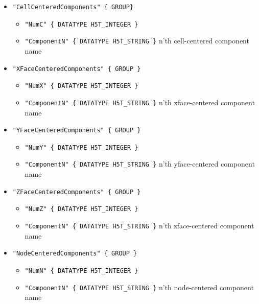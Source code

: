 \begin{itemize}
    \item {\tt "CellCenteredComponents" \{ GROUP\}}
        \begin{itemize} 
            \item  {\tt "NumC" \{ DATATYPE  H5T\_INTEGER \}}
            \item {\tt "ComponentN"  \{ DATATYPE  H5T\_STRING \}} n'th 
                cell-centered  component name
        \end{itemize}
    \item {\tt "XFaceCenteredComponents" \{ GROUP \}}
        \begin{itemize}
            \item  {\tt "NumX" \{ DATATYPE  H5T\_INTEGER \}}
            \item {\tt "ComponentN"  \{ DATATYPE  H5T\_STRING \}} n'th 
                xface-centered  component name
        \end{itemize}
    \item {\tt "YFaceCenteredComponents" \{ GROUP \}}
        \begin{itemize} 
           \item  {\tt "NumY" \{ DATATYPE  H5T\_INTEGER \}}
          \item {\tt "ComponentN"  \{ DATATYPE  H5T\_STRING \}} n'th 
                yface-centered  component name
        \end{itemize}
    \item {\tt "ZFaceCenteredComponents" \{ GROUP \}}
        \begin{itemize} 
                \item  {\tt "NumZ" \{ DATATYPE  H5T\_INTEGER \}}
                \item {\tt "ComponentN"  \{ DATATYPE  H5T\_STRING \}} n'th 
                zface-centered  component name
        \end{itemize}
    \item {\tt "NodeCenteredComponents"  \{ GROUP \}}
        \begin{itemize} 
               \item  {\tt "NumN" \{ DATATYPE  H5T\_INTEGER \}}
                \item {\tt "ComponentN"  \{ DATATYPE  H5T\_STRING \}} n'th 
                node-centered  component name
        \end{itemize}
  \end{itemize}

